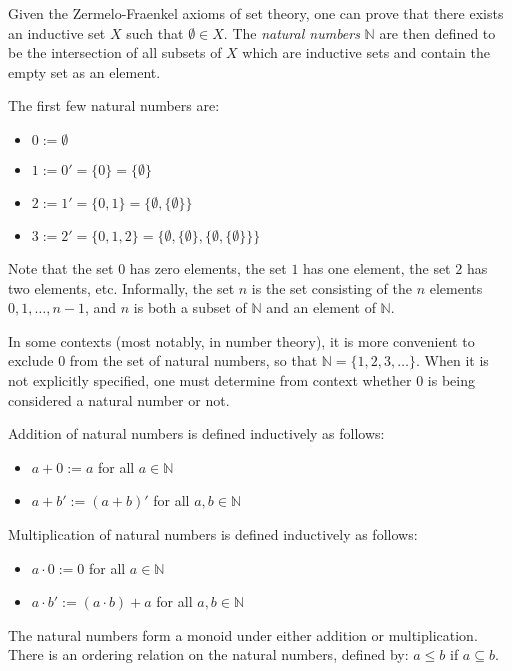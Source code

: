 \documentclass{article}
\begin{document}
Given the Zermelo-Fraenkel axioms of set theory, one can prove that there exists an inductive set $X$ such that $\emptyset \in X$. The {\em natural numbers} $\mathbb{N}$ are then defined to be the intersection of all subsets of $X$ which are inductive sets and contain the empty set as an element.

The first few natural numbers are:
\begin{itemize}
\item $0 := \emptyset$
\item $1 := 0' = \{0\} = \{ \emptyset \}$
\item $2 := 1' = \{0,1\} = \{\emptyset, \{ \emptyset \} \}$
\item $3 := 2' = \{0,1,2\} = \{\emptyset, \{ \emptyset \}, \{ \emptyset, \{ \emptyset \} \} \}$
\end{itemize}

Note that the set $0$ has zero elements, the set $1$ has one element, the set $2$ has two elements, etc. Informally, the set $n$ is the set consisting of the $n$ elements $0, 1, \dots, n-1$, and $n$ is both a subset of $\mathbb{N}$ and an element of $\mathbb{N}$.

In some contexts (most notably, in number theory), it is more convenient to exclude $0$ from the set of natural numbers, so that $\mathbb{N} = \{1,2,3,\dots\}$. When it is not explicitly specified, one must determine from context whether $0$ is being considered a natural number or not.

Addition of natural numbers is defined inductively as follows:
\begin{itemize}
\item $a + 0 := a$ for all $a \in \mathbb{N}$
\item $a + b' := (a+b)'$ for all $a,b \in \mathbb{N}$
\end{itemize}

Multiplication of natural numbers is defined inductively as follows:
\begin{itemize}
\item $a \cdot 0 := 0$ for all $a \in \mathbb{N}$
\item $a \cdot b' := (a\cdot b) + a$ for all $a,b \in \mathbb{N}$
\end{itemize}
The natural numbers form a monoid under either addition or multiplication. There is an ordering relation on the natural numbers, defined by: $a \leq b$ if $a \subseteq b$.
\end{document}
